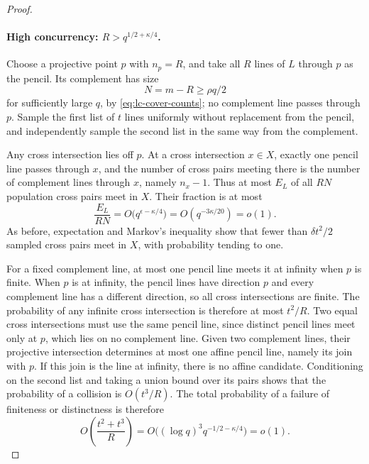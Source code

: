 \begin{proof}
\paragraph{High concurrency: $R>q^{1/2+\kappa/4}$.}
Choose a projective point $p$ with $n_p=R$, and take all $R$ lines of
$L$ through $p$ as the pencil. Its complement has size
\[
 N=m-R\geq\rho q/2
\]
for sufficiently large $q$, by \eqref{eq:lc-cover-counts}; no
complement line passes through $p$. Sample the first list of $t$ lines
uniformly without replacement from the pencil, and independently
sample the second list in the same way from the complement.

Any cross intersection lies off $p$. At a cross intersection
$x\in X$, exactly one pencil line passes through $x$, and the number
of cross pairs meeting there is the number of complement lines
through $x$, namely $n_x-1$. Thus at most $E_L$ of all $RN$ population
cross pairs meet in $X$. Their fraction is at most
\begin{equation}\label{eq:lc-high-pair-fraction}
 \frac{E_L}{RN}
 =O\bigl(q^{\epsilon-\kappa/4}\bigr)
 =O(q^{-3\kappa/20})=o(1).
\end{equation}
As before, expectation and Markov's inequality show that fewer than
$\delta t^2/2$ sampled cross pairs meet in $X$, with probability
tending to one.

For a fixed complement line, at most one pencil line meets it at
infinity when $p$ is finite. When $p$ is at infinity, the pencil lines
have direction $p$ and every complement line has a different
direction, so all cross intersections are finite. The probability of
any infinite cross intersection is therefore at most $t^2/R$.
Two equal cross intersections must use the same pencil line, since
distinct pencil lines meet only at $p$, which lies on no complement
line. Given two complement lines, their projective intersection
determines at most one affine pencil line, namely its join with $p$.
If this join is the line at infinity, there is no affine candidate.
Conditioning on the second list and taking a union bound over its
pairs shows that the probability of a collision is $O(t^3/R)$.
The total probability of a failure of finiteness or distinctness is
therefore
\begin{equation}\label{eq:lc-high-degeneracy}
 O\left(\frac{t^2+t^3}{R}\right)
 =O\bigl((\log q)^3q^{-1/2-\kappa/4}\bigr)=o(1).
\end{equation}


\end{proof}
